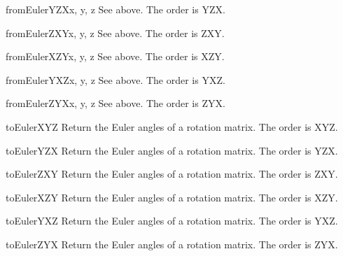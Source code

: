 \begin{methoddesc}{fromEulerYZX}{x, y, z}
See above. The order is YZX.
\end{methoddesc}

\begin{methoddesc}{fromEulerZXY}{x, y, z}
See above. The order is ZXY.
\end{methoddesc}

\begin{methoddesc}{fromEulerXZY}{x, y, z}
See above. The order is XZY.
\end{methoddesc}

\begin{methoddesc}{fromEulerYXZ}{x, y, z}
See above. The order is YXZ.
\end{methoddesc}

\begin{methoddesc}{fromEulerZYX}{x, y, z}
See above. The order is ZYX.
\end{methoddesc}

\begin{methoddesc}{toEulerXYZ}{}
Return the Euler angles of a rotation matrix. The order is XYZ.
\end{methoddesc}

\begin{methoddesc}{toEulerYZX}{}
Return the Euler angles of a rotation matrix. The order is YZX.
\end{methoddesc}

\begin{methoddesc}{toEulerZXY}{}
Return the Euler angles of a rotation matrix. The order is ZXY.
\end{methoddesc}

\begin{methoddesc}{toEulerXZY}{}
Return the Euler angles of a rotation matrix. The order is XZY.
\end{methoddesc}

\begin{methoddesc}{toEulerYXZ}{}
Return the Euler angles of a rotation matrix. The order is YXZ.
\end{methoddesc}

\begin{methoddesc}{toEulerZYX}{}
Return the Euler angles of a rotation matrix. The order is ZYX.
\end{methoddesc}
